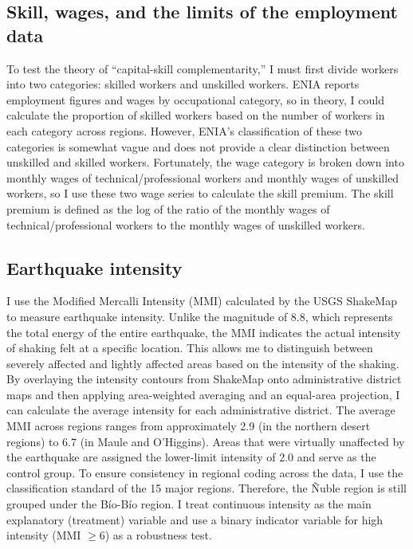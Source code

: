 \documentclass[12pt]{article}
\begin{document}
\subsection{Skill, wages, and the limits of the employment data}
To test the theory of ``capital-skill complementarity,'' I must first divide workers into two
categories: skilled workers and unskilled workers. ENIA reports employment figures and wages by
occupational category, so in theory, I could calculate the proportion of skilled workers based on
the number of workers in each category across regions. However, ENIA's classification of these two
categories is somewhat vague and does not provide a clear distinction between unskilled and skilled
workers. Fortunately, the wage category is broken down into monthly wages of technical/professional
workers and monthly wages of unskilled workers, so I use these two wage series to calculate the
skill premium. The skill premium is defined as the log of the ratio of the monthly wages of
technical/professional workers to the monthly wages of unskilled workers.

\subsection{Earthquake intensity}
I use the Modified Mercalli Intensity (MMI) calculated by the USGS ShakeMap \citep{usgs2011} to measure earthquake
intensity. Unlike the magnitude of 8.8, which represents the total energy of the entire earthquake,
the MMI indicates the actual intensity of shaking felt at a specific location. This allows me to
distinguish between severely affected and lightly affected areas based on the intensity of the
shaking. By overlaying the intensity contours from ShakeMap onto administrative district maps and
then applying area-weighted averaging and an equal-area projection, I can calculate the average
intensity for each administrative district. The average MMI across regions ranges from approximately
2.9 (in the northern desert regions) to 6.7 (in Maule and O'Higgins). Areas that were virtually
unaffected by the earthquake are assigned the lower-limit intensity of 2.0 and serve as the control
group. To ensure consistency in regional coding across the data, I use the classification standard
of the 15 major regions. Therefore, the \~Nuble region is still grouped under the B\'io-B\'io region.
I treat continuous intensity as the main explanatory (treatment) variable and use a binary indicator
variable for high intensity (MMI $\geq 6$) as a robustness test.
\end{document}
